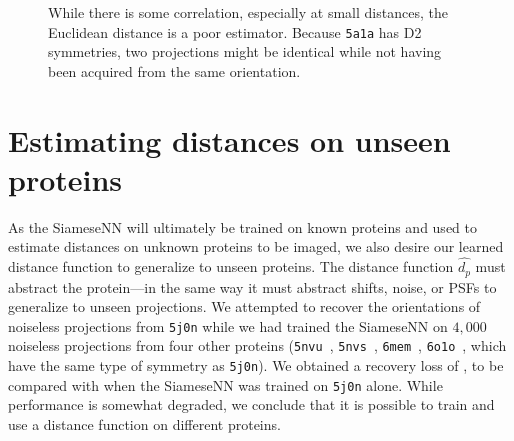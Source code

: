 \begin{figure}[ht!]
\begin{minipage}[t]{0.57\linewidth}
{    %
            While there is some correlation, especially at small distances, the Euclidean distance is a poor estimator.
            Because \texttt{5a1a} has D2 symmetries, two projections might be identical while not having been acquired from the same orientation.
        }\label{fig:euclidean-not-robust}
    \end{minipage}
\end{figure}

\section{Estimating distances on unseen proteins}\label{apx:unseen-proteins}

As the SiameseNN will ultimately be trained on known proteins and used to estimate distances on unknown proteins to be imaged,
we also desire our learned distance function to generalize to unseen proteins.
The distance function $\widehat{d_p}$ must abstract the protein---in the same way it must abstract shifts, noise, or PSFs to generalize to unseen projections.
We attempted to recover the orientations of noiseless projections from \texttt{5j0n} while we had trained the SiameseNN on $4,000$ noiseless projections from four other proteins (\texttt{5nvu}~\cite{ZHANG20171303}, \texttt{5nvs}~\cite{ZHANG20171303}, \texttt{6mem}~\cite{iwai2018unique}, \texttt{6o1o}~\cite{liu2019target}, which have the same type of symmetry as \texttt{5j0n}).
We obtained a recovery loss of ,
to be compared with  when the SiameseNN was trained on \texttt{5j0n} alone.
While performance is somewhat degraded, we conclude that it is possible to train and use a distance function on different proteins.

